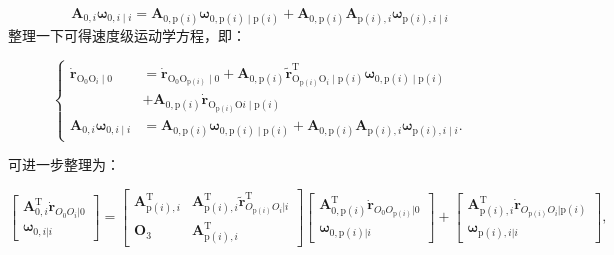\[
\boldsymbol{A}_{0, i} \boldsymbol{\omega}_{0, i \mid i}  =\boldsymbol{A}_{0, \mathrm{p}(i)} \boldsymbol{\omega}_{0, \mathrm{p}(i) \mid \mathrm{p}(i)}+\boldsymbol{A}_{0, \mathrm{p}(i)} \boldsymbol{A}_{\mathrm{p}(i), i} \boldsymbol{\omega}_{\mathrm{p}(i), i \mid i}
\]
整理一下可得速度级运动学方程，即：

\[
\left\{\begin{aligned}
\dot{\boldsymbol{r}}_{\mathrm{O}_{0} \mathrm{O}_{i} \mid 0} & =\dot{\boldsymbol{r}}_{\mathrm{O}_{0} \mathrm{O}_{\mathrm{p}(i)} \mid 0}+\boldsymbol{A}_{0, \mathrm{p}(i)} \tilde{\boldsymbol{r}}^{\mathrm{T}}_{\mathrm{O}_{\mathrm{p}(i)} \mathrm{O}_{i} \mid \mathrm{p}(i)} \boldsymbol{\omega}_{0, \mathrm{p}(i) \mid \mathrm{p}(i)} \\
& +\boldsymbol{A}_{0, \mathrm{p}(i)} \dot{\boldsymbol{r}}_{\mathrm{O}_{\mathrm{p}(i)} \mathrm{O} i \mid \mathrm{p}(i)} \\
\boldsymbol{A}_{0, i} \boldsymbol{\omega}_{0, i \mid i} & =\boldsymbol{A}_{0, \mathrm{p}(i)} \boldsymbol{\omega}_{0, \mathrm{p}(i) \mid \mathrm{p}(i)}+\boldsymbol{A}_{0, \mathrm{p}(i)} \boldsymbol{A}_{\mathrm{p}(i), i} \boldsymbol{\omega}_{\mathrm{p}(i), i \mid i} .
\end{aligned}\right.
\]

可进一步整理为：

\[
\begin{bmatrix} \boldsymbol{A}_{0,i}^{\mathrm{T}} \dot{\boldsymbol{r}}_{O_0 O_i|0} \\ \boldsymbol{\omega}_{0,i|i} \end{bmatrix}
=
\begin{bmatrix} \boldsymbol{A}_{\mathrm{p}(i),i}^{\mathrm{T}} & \boldsymbol{A}_{\mathrm{p}(i),i}^{\mathrm{T}} \tilde{\boldsymbol{r}}_{O_{\mathrm{p}(i)} O_i|i}^{\mathrm{T}} \\ \boldsymbol{O}_3 & \boldsymbol{A}_{\mathrm{p}(i),i}^{\mathrm{T}} \end{bmatrix}
\begin{bmatrix} \boldsymbol{A}_{0,\mathrm{p}(i)}^{\mathrm{T}} \dot{\boldsymbol{r}}_{O_0 O_{\mathrm{p}(i)}|0} \\ \boldsymbol{\omega}_{0,\mathrm{p}(i)|i} \end{bmatrix}
+
\begin{bmatrix} \boldsymbol{A}_{\mathrm{p}(i),i}^{\mathrm{T}} \dot{\boldsymbol{r}}_{O_{\mathrm{p}(i)} O_i|\mathrm{p}(i)} \\ \boldsymbol{\omega}_{\mathrm{p}(i),i|i} \end{bmatrix},
\]


